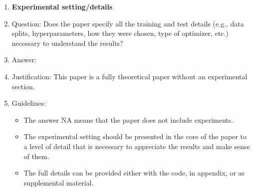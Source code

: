 \documentclass{article}
\theoremstyle{plain}
\theoremstyle{definition}
\theoremstyle{remark}
\begin{document}
\begin{enumerate}
\item {\bf Experimental setting/details}
    \item[] Question: Does the paper specify all the training and test details (e.g., data splits, hyperparameters, how they were chosen, type of optimizer, etc.) necessary to understand the results?
    \item[] Answer: \answerNA{} %
    \item[] Justification: This paper is a fully theoretical paper without an experimental section.
    \item[] Guidelines:
    \begin{itemize}
        \item The answer NA means that the paper does not include experiments.
        \item The experimental setting should be presented in the core of the paper to a level of detail that is necessary to appreciate the results and make sense of them.
        \item The full details can be provided either with the code, in appendix, or as supplemental material.
    \end{itemize}


\end{enumerate}
\end{document}
